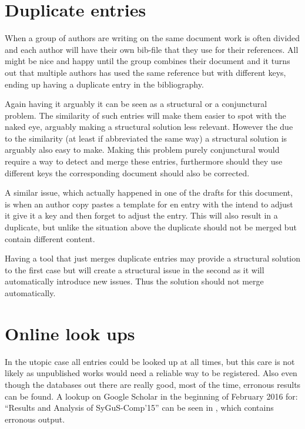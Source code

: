 \section{Duplicate entries}
\label{sec:problems_duplicates}

When a group of authors are writing on the same document work is often
divided and each author will have their own bib-file that they use for
their references.  All might be nice and happy until the group
combines their document and it turns out that multiple authors has
used the same reference but with different keys, ending up having a
duplicate entry in the bibliography.

Again having it arguably it can be seen as a structural or a
conjunctural problem.  The similarity of such entries will make them
easier to spot with the naked eye, arguably making a structural
solution less relevant.  However the due to the similarity (at least
if abbreviated the same way) a structural solution is arguably also
easy to make.  Making this problem purely conjunctural would require a
way to detect and merge these entries, furthermore should they use
different keys the corresponding document should also be corrected.

A similar issue, which actually happened in one of the drafts for this
document, is when an author copy pastes a template for en entry with
the intend to adjust it give it a key and then forget to adjust the
entry.  This will also result in a duplicate, but unlike the situation
above the duplicate should not be merged but contain different
content.

Having a tool that just merges duplicate entries may provide a
structural solution to the first case but will create a structural
issue in the second as it will automatically introduce new issues.
Thus the solution should not merge automatically.


\section{Online look ups}
\label{sec:problems_look_ups}

In the utopic case all entries could be looked up at all times, but
this care is not likely as unpublished works would need a reliable way
to be registered.  Also even though the databases out there are really
good, most of the time, erronous results can be found.  A lookup on
Google Scholar in the beginning of February 2016 for: ``Results and
Analysis of SyGuS-Comp’15'' can be seen in
, which contains erronous output.

